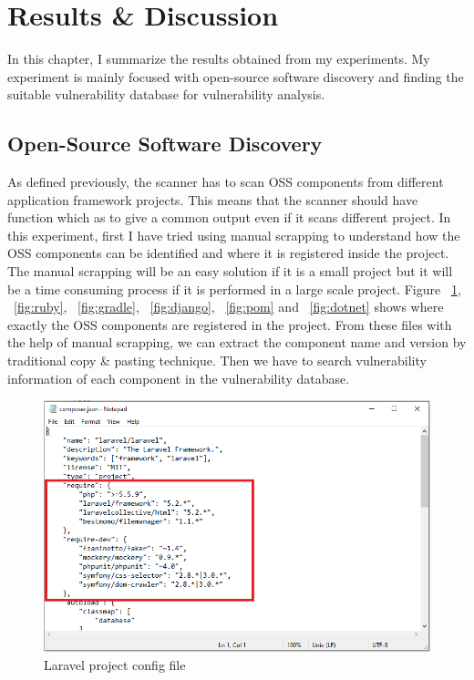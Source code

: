 %
\section{Results \& Discussion}\label{sec:Results & Discussion}
%
In this chapter, I summarize the results obtained from my experiments. My experiment is mainly focused with open-source software discovery and finding the suitable vulnerability database for vulnerability analysis.

\subsection{Open-Source Software Discovery}
As defined previously, the scanner has to scan \acs{OSS} components from different application framework projects. This means that the scanner should have function which as to give a common output even if it scans different project. In this experiment, first I have tried using manual scrapping to understand how the \acs{OSS} components can be identified and where it is registered inside the project. The manual scrapping will be an easy solution if it is a small project but it will be a time consuming process if it is performed in a large scale project. Figure ~\ref{fig:laravel}, ~\ref{fig:ruby}, ~\ref{fig:gradle}, ~\ref{fig:django}, ~\ref{fig:pom} and ~\ref{fig:dotnet} shows where exactly the OSS components are registered in the project. From these files with the help of manual scrapping, we can extract the component name and version by traditional copy \& pasting technique. Then we have to search vulnerability information of each component in the vulnerability database.
\begin{figure}[h!]
	\includegraphics[width=15cm]{includes/laravel.PNG}
	\centering
	\caption{Laravel project config file}
	\label{fig:laravel}
\end{figure}

